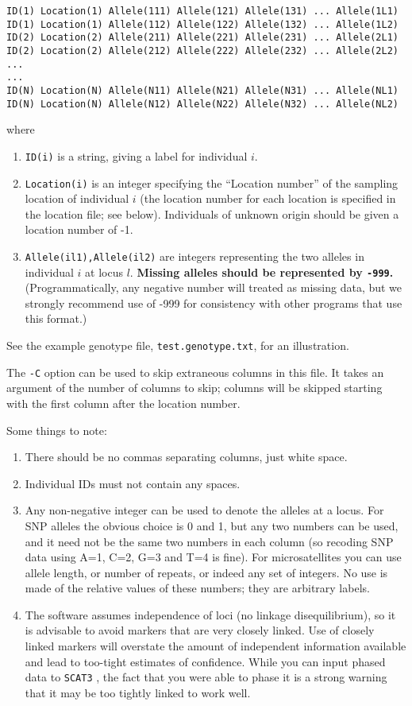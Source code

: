 \documentclass[10pt,titlepage,times,letterpaper]{article}
\def\SCAT{{\tt SCAT3} }
\begin{document}
\begin{verbatim}
ID(1) Location(1) Allele(111) Allele(121) Allele(131) ... Allele(1L1)
ID(1) Location(1) Allele(112) Allele(122) Allele(132) ... Allele(1L2)
ID(2) Location(2) Allele(211) Allele(221) Allele(231) ... Allele(2L1)
ID(2) Location(2) Allele(212) Allele(222) Allele(232) ... Allele(2L2)
...
...
ID(N) Location(N) Allele(N11) Allele(N21) Allele(N31) ... Allele(NL1)
ID(N) Location(N) Allele(N12) Allele(N22) Allele(N32) ... Allele(NL2)
\end{verbatim}
where
\begin{enumerate}
\item{\tt ID(i)} is a string, giving a label for individual $i$.
\item{\tt Location(i)} is an integer specifying the ``Location number'' of
the sampling location
of individual $i$ (the location number for each location 
is specified in the location file; see below). Individuals of unknown
origin should be given a location number of -1.
\item{{\tt Allele(il1),Allele(il2)}} are integers representing the two alleles in
individual $i$ at locus $l$. {\bf Missing alleles should
be represented by {\tt -999}.}  (Programmatically, any negative number
will treated as missing data, but we strongly recommend use of -999 for
consistency with other programs that use this format.)
\end{enumerate}
See the example genotype file, {\tt test.genotype.txt}, for an illustration.

The {\tt -C} option can be used to skip extraneous columns in this
file.  It takes an argument of the number of columns to skip;
columns will be skipped starting with the first column after the location
number.

Some things to note:
\begin{enumerate}
\item There should be no commas separating columns, just white space.
\item Individual IDs must not contain any spaces.
\item Any non-negative integer can be used to denote the alleles at a locus.
For SNP alleles the obvious choice is 0 and 1, but any two numbers can be used,
and it need not be the same two numbers in each column (so recoding SNP data 
using A=1, C=2, G=3 and T=4 is fine).  For microsatellites you can use 
allele length, or number of repeats, or indeed any set of integers.  No use 
is made of the relative values of these numbers; they are arbitrary labels.
\item The software assumes independence of loci (no linkage disequilibrium),
so it is advisable to avoid markers that are very closely linked. 
Use of closely linked markers will overstate the amount of independent 
information available and lead to too-tight estimates of confidence.
While you can input phased data to \SCAT, the fact that you were able to phase
it is a strong warning that it may be too tightly linked to work well.
\end{enumerate}
\end{document}
